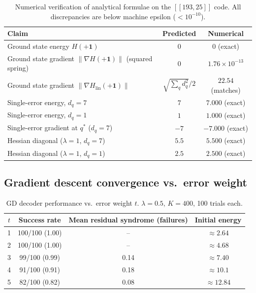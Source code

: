 \documentclass[12pt,a4paper]{article}
\theoremstyle{plain}
\theoremstyle{definition}
\theoremstyle{remark}
\begin{document}
\begin{table}[ht]
\centering
\caption{Numerical verification of analytical formulae on the $[[193,25]]$ code.
  All discrepancies are below machine epsilon ($<10^{-10}$).}
\label{tab:analytical}
\small
\begin{tabular}{lcc}
\toprule
Claim & Predicted & Numerical \\
\midrule
Ground state energy $H(+\bm{1})$ & $0$ & $0$ (exact) \\
Ground state gradient $\|\nabla H(+\bm{1})\|$ (squared spring) & $0$ & $1.76\times10^{-13}$ \\
Ground state gradient $\|\nabla H_{\mathrm{lin}}(+\bm{1})\|$ & $\sqrt{\sum_q d_q^2}/2$ & $22.54$ (matches) \\
Single-error energy, $d_q = 7$ & $7$ & $7.000$ (exact) \\
Single-error energy, $d_q = 1$ & $1$ & $1.000$ (exact) \\
Single-error gradient at $q^*$ ($d_q=7$) & $-7$ & $-7.000$ (exact) \\
Hessian diagonal ($\lambda=1$, $d_q=7$) & $5.5$ & $5.500$ (exact) \\
Hessian diagonal ($\lambda=1$, $d_q=1$) & $2.5$ & $2.500$ (exact) \\
\bottomrule
\end{tabular}
\end{table}

\subsection{Gradient descent convergence vs.\ error weight}

\begin{table}[ht]
\centering
\caption{GD decoder performance vs.\ error weight $t$.
  $\lambda=0.5$, $K=400$, 100 trials each.}
\label{tab:convergence}
\small
\begin{tabular}{cccc}
\toprule
$t$ & Success rate & Mean residual syndrome (failures) & Initial energy \\
\midrule
1 & 100/100 (1.00) & -- & $\approx 2.64$ \\
2 & 100/100 (1.00) & -- & $\approx 4.68$ \\
3 & 99/100 (0.99) & 0.14 & $\approx 7.40$ \\
4 & 91/100 (0.91) & 0.18 & $\approx 10.1$ \\
5 & 82/100 (0.82) & 0.08 & $\approx 12.84$ \\
\bottomrule
\end{tabular}
\end{table}
\end{document}
